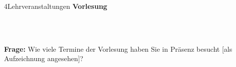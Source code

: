 \documentclass[xcolor=table,9pt,aspectratio=169]{beamer}
\begin{document}
\begin{frame}{\vspace*{10mm}4\hspace*{1em}Lehrveranstaltungen}
\textbf{Vorlesung}\\
\begin{multicols}{2}
   \begin{center}
      \\
      \\
   \end{center}
\end{multicols}
\textbf{Frage:} Wie viele Termine der Vorlesung haben Sie in Präsenz besucht [als Aufzeichnung angesehen]?
\end{frame}
\end{document}
